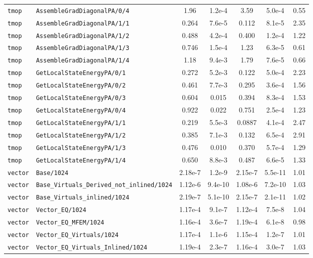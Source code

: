 \begin{tabular}{ll S[table-format=3.4e-1] S[table-format=1.2e-1] S[table-format=3.4e-1] S[table-format=1.2e-1] S[table-format=2.2]}
\texttt{tmop} & \texttt{AssembleGradDiagonalPA/0/4} & 1.96 & 1.2e-4 & 3.59 & 5.0e-4 & 0.55 \\
\texttt{tmop} & \texttt{AssembleGradDiagonalPA/1/1} & 0.264 & 7.6e-5 & 0.112 & 8.1e-5 & 2.35 \\
\texttt{tmop} & \texttt{AssembleGradDiagonalPA/1/2} & 0.488 & 4.2e-4 & 0.400 & 1.2e-4 & 1.22 \\
\texttt{tmop} & \texttt{AssembleGradDiagonalPA/1/3} & 0.746 & 1.5e-4 & 1.23 & 6.3e-5 & 0.61 \\
\texttt{tmop} & \texttt{AssembleGradDiagonalPA/1/4} & 1.18 & 9.4e-3 & 1.79 & 7.6e-5 & 0.66 \\
\texttt{tmop} & \texttt{GetLocalStateEnergyPA/0/1} & 0.272 & 5.2e-3 & 0.122 & 5.0e-4 & 2.23 \\
\texttt{tmop} & \texttt{GetLocalStateEnergyPA/0/2} & 0.461 & 7.7e-3 & 0.295 & 3.6e-4 & 1.56 \\
\texttt{tmop} & \texttt{GetLocalStateEnergyPA/0/3} & 0.604 & 0.015 & 0.394 & 8.3e-4 & 1.53 \\
\texttt{tmop} & \texttt{GetLocalStateEnergyPA/0/4} & 0.922 & 0.022 & 0.751 & 2.5e-4 & 1.23 \\
\texttt{tmop} & \texttt{GetLocalStateEnergyPA/1/1} & 0.219 & 5.5e-3 & 0.0887 & 4.1e-4 & 2.47 \\
\texttt{tmop} & \texttt{GetLocalStateEnergyPA/1/2} & 0.385 & 7.1e-3 & 0.132 & 6.5e-4 & 2.91 \\
\texttt{tmop} & \texttt{GetLocalStateEnergyPA/1/3} & 0.476 & 0.010 & 0.370 & 5.7e-4 & 1.29 \\
\texttt{tmop} & \texttt{GetLocalStateEnergyPA/1/4} & 0.650 & 8.8e-3 & 0.487 & 6.6e-5 & 1.33 \\
\texttt{vector} & \texttt{Base/1024} & 2.18e-7 & 1.2e-9 & 2.15e-7 & 5.5e-11 & 1.01 \\
\texttt{vector} & \texttt{Base\_Virtuals\_Derived\_not\_inlined/1024} & 1.12e-6 & 9.4e-10 & 1.08e-6 & 7.2e-10 & 1.03 \\
\texttt{vector} & \texttt{Base\_Virtuals\_inlined/1024} & 2.19e-7 & 5.1e-10 & 2.15e-7 & 2.1e-11 & 1.02 \\
\texttt{vector} & \texttt{Vector\_EQ/1024} & 1.17e-4 & 9.1e-7 & 1.12e-4 & 7.5e-8 & 1.04 \\
\texttt{vector} & \texttt{Vector\_EQ\_MFEM/1024} & 1.16e-4 & 3.6e-7 & 1.19e-4 & 6.1e-8 & 0.98 \\
\texttt{vector} & \texttt{Vector\_EQ\_Virtuals/1024} & 1.17e-4 & 1.1e-6 & 1.15e-4 & 1.2e-7 & 1.01 \\
\texttt{vector} & \texttt{Vector\_EQ\_Virtuals\_Inlined/1024} & 1.19e-4 & 2.3e-7 & 1.16e-4 & 3.0e-7 & 1.03 \\

\end{tabular}
